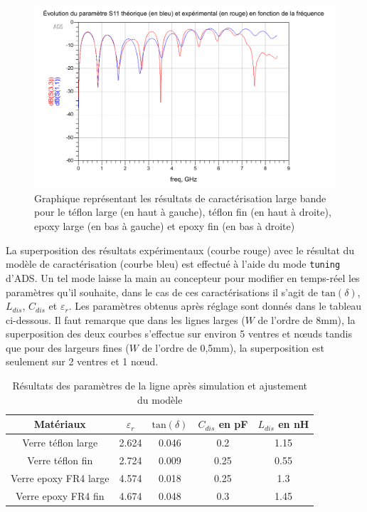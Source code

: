 \documentclass[french]{article}
\begin{document}
\begin{figure}[H]
	\includegraphics[scale=0.21]{../2carac/caract_large_bande/caract_large_bande_epoxyfin.png}
	\caption{Graphique représentant les résultats de caractérisation large bande pour le téflon large (en haut à gauche), téflon fin (en haut à droite), epoxy large (en bas à gauche) et epoxy fin (en bas à droite)}
	\label{fig:caracterisations}
\end{figure}

La superposition des résultats expérimentaux (courbe rouge) avec le résultat du modèle de caractérisation (courbe bleu) est effectué à l'aide du mode \texttt{tuning} d'ADS. Un tel mode laisse la main au concepteur pour modifier en temps-réel les paramètres qu'il souhaite, dans le cas de ces caractérisations il s'agit de $\mbox{tan}(\delta)$, $L_{dis}$, $C_{dis}$ et $\varepsilon_r$. Les paramètres obtenus après réglage sont donnés dans le tableau ci-dessous. Il faut remarque que dans les lignes larges ($W$ de l'ordre de 8mm), la superposition des deux courbes s'effectue sur environ 5 ventres et nœuds tandis que pour des largeurs fines ($W$ de l'ordre de 0,5mm), la superposition est seulement sur 2 ventres et 1 nœud.

\begin{table}[H]
	\centering
	\begin{tabular}{|c|c|c|c|c|}
		\hline
		Matériaux & $\varepsilon_r$ & $\mbox{tan}(\delta)$ & $C_{dis}$ en pF & $L_{dis}$ en nH\\
		\hline
		Verre téflon large & 2.624 & 0.046 & 0.2 & 1.15\\
		\hline
		Verre téflon fin & 2.724 & 0.009 & 0.25 & 0.55\\
		\hline
		Verre epoxy FR4 large & 4.574 & 0.018 & 0.25 & 1.3\\
		\hline
		Verre epoxy FR4 fin & 4.674 & 0.048 & 0.3 & 1.45\\
		\hline
	\end{tabular}
	\caption{Résultats des paramètres de la ligne après simulation et ajustement du modèle}
\end{table}
\end{document}
